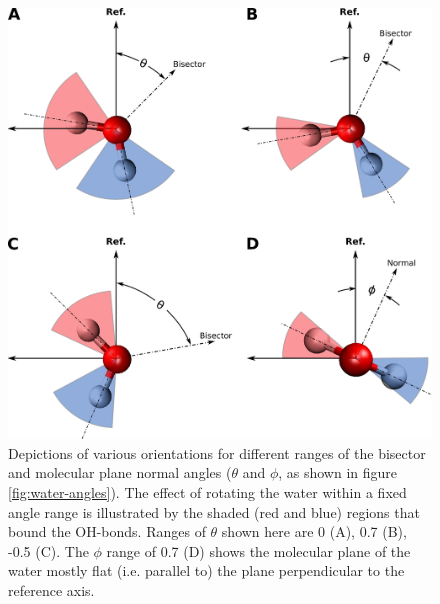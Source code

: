 \newcommand{\degree}{\ensuremath{^\circ}}

\begin{figure}[h!]
\begin{center}
	\includegraphics[scale=1.0]{images/h2o-angle-ranges.png}
	\caption{Depictions of various orientations for different ranges of the bisector and molecular plane normal angles ($\theta$ and $\phi$, as shown in figure \ref{fig:water-angles}). The effect of rotating the water within a fixed angle range is illustrated by the shaded (red and blue) regions that bound the OH-bonds. Ranges of $\theta$ shown here are 0 (A), 0.7 (B), -0.5 (C). The $\phi$ range of 0.7 (D) shows the molecular plane of the water mostly flat (i.e. parallel to) the plane perpendicular to the reference axis.}
	\label{fig:angle-ranges}
\end{center}
\end{figure}

